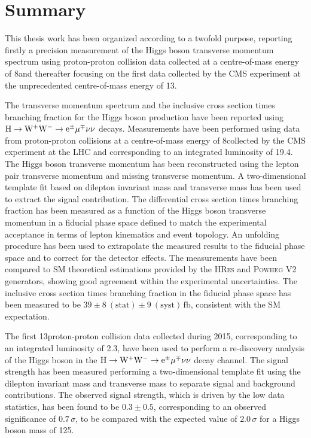 \chapter*{Summary}
\thispagestyle{empty}

This thesis work has been organized according to a twofold purpose, reporting firstly a precision measurement of the Higgs boson transverse momentum spectrum using proton-proton collision data collected at a centre-of-mass energy of 8\TeV and thereafter focusing on the first data collected by the CMS experiment at the unprecedented centre-of-mass energy of 13\TeV.

The transverse momentum spectrum and the inclusive cross section times branching fraction for the Higgs boson production have been reported using $\rm{H}\to\rm{W^+W^-}\to e^{\pm} \mu^{\mp}\nu\nu$ decays. Measurements have been performed using data from proton-proton collisions at a centre-of-mass energy of 8\TeV collected by the CMS experiment at the LHC and corresponding to an integrated luminosity of 19.4\ifb. The Higgs boson transverse momentum has been reconstructed using the lepton pair transverse momentum and missing transverse momentum. A two-dimensional template fit based on dilepton invariant mass and transverse mass has been used to extract the signal contribution. The differential cross section times branching fraction has been measured as a function of the Higgs boson transverse momentum in a fiducial phase space defined to match the experimental acceptance in terms of lepton kinematics and event topology. An unfolding procedure has been used to extrapolate the measured results to the fiducial phase space and to correct for the detector effects.
The measurements have been compared to SM theoretical estimations provided by the \textsc{HRes} and \textsc{Powheg V2} generators, showing good agreement within the experimental uncertainties. The inclusive cross section times branching fraction in the fiducial phase space has been measured to be $39\pm 8~(\mathrm{stat}) \pm 9~(\mathrm{syst})\,\mathrm{fb}$, consistent with the SM expectation.

The first 13\TeV proton-proton collision data collected during 2015, corresponding to an integrated luminosity of 2.3\ifb, have been used to perform a re-discovery analysis of the Higgs boson in the $\rm{H}\to\rm{W^+W^-}\to e^{\pm} \mu^{\mp}\nu\nu$ decay channel. The signal strength has been measured performing a two-dimensional template fit using the dilepton invariant mass and transverse mass to separate signal and background contributions.
The observed signal strength, which is driven by the low data statistics, has been found to be $0.3\pm0.5$, corresponding to an observed significance of $0.7\,\sigma$, to be compared with the expected value of $2.0\,\sigma$ for a Higgs boson mass of 125\GeV.

